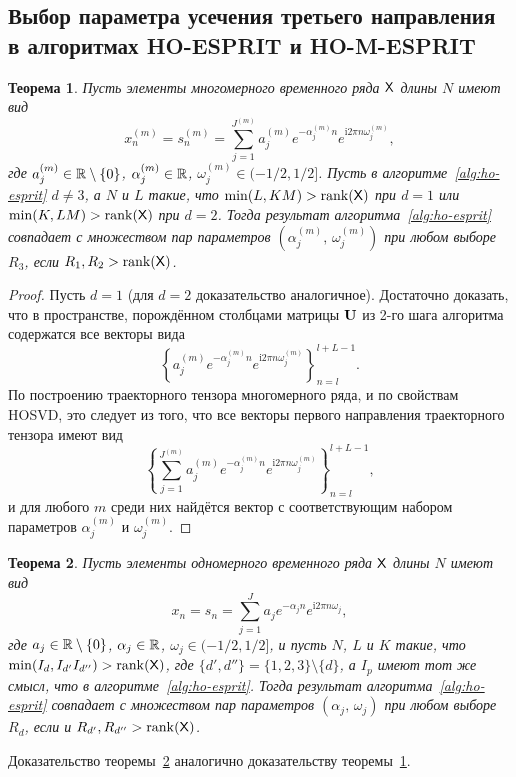 \documentclass[specialist,
  substylefile=spbu_report.rtx,
subf,href,colorlinks=true, 12pt]{disser}
\theoremstyle{plain}
\newtheorem{theorem}{Теорема}
\theoremstyle{definition}
\theoremstyle{remark}
\newcommand{\iu}{\mathrm{i}}
\begin{document}
\subsection{Выбор параметра усечения третьего направления в алгоритмах
HO-ESPRIT и HO-M-ESPRIT}\label{subsec:ho-esprit-r3}
\begin{theorem}\label{theorem:ho-m-esprit-r3}
  Пусть элементы многомерного временного ряда $\mathsf{X}$ длины $N$ имеют вид
  \begin{equation*}
    x_n^{(m)} = s_n^{(m)} = \sum_{j=1}^{J^{(m)}}
    a_j^{(m)} e^{-\alpha_j^{(m)} n} e^{\iu
    2 \pi n \omega_j^{(m)}},
  \end{equation*}
  где $a_j^{(m)} \in \mathbb{R} \setminus \{0\}$, $\alpha_j^{(m)} \in \mathbb{R}$,
  $\omega_j^{(m)} \in (-1/2, 1/2]$.
  Пусть в алгоритме~\ref{alg:ho-esprit} $d \ne 3$, а $N$ и $L$ такие,
  что $\min(L, KM) > \operatorname{rank}(\mathsf{X})$
  при $d=1$ или $\min(K, LM) > \operatorname{rank}(\mathsf{X})$ при $d=2$.
  Тогда результат алгоритма~\ref{alg:ho-esprit} совпадает с множеством
  пар параметров $(\alpha_j^{(m)},\, \omega_j^{(m)})$ при любом выборе $R_3$,
  если $R_1, R_2 >
  \operatorname{rank}(\mathsf{X})$.
\end{theorem}
\begin{proof}
  Пусть $d = 1$ (для $d=2$ доказательство аналогичное). Достаточно
  доказать, что в пространстве, порождённом столбцами
  матрицы $\mathbf{U}$ из 2-го шага алгоритма содержатся все векторы вида
  \[
    \left\{a_j^{(m)} e^{-\alpha_j^{(m)} n} e^{\iu
    2 \pi n \omega_j^{(m)}}\right\}_{n=l}^{l+L-1}.
  \]
  По построению траекторного тензора многомерного ряда, и по
  свойствам HOSVD, это
  следует из того, что все векторы первого направления траекторного
  тензора имеют вид
  \[
    \left\{\sum_{j=1}^{J^{(m)}} a_j^{(m)} e^{-\alpha_j^{(m)} n} e^{\iu
    2 \pi n \omega_j^{(m)}}\right\}_{n=l}^{l + L - 1},
  \]
  и для любого $m$ среди них найдётся вектор с соответствующим
  набором параметров $\alpha_j^{(m)}$ и $\omega_j^{(m)}$.
\end{proof}

\begin{theorem}\label{theorem:ho-esprit-r3}
  Пусть элементы одномерного временного ряда $\mathsf{X}$ длины $N$ имеют вид
  \begin{equation*}
    x_n = s_n = \sum_{j=1}^{J} a_j e^{-\alpha_j n} e^{\iu
    2 \pi n \omega_j},
  \end{equation*}
  где $a_j \in \mathbb{R} \setminus \{0\}$, $\alpha_j \in \mathbb{R}$, $\omega_j
  \in (-1/2, 1/2]$,
  и пусть $N$, $L$ и $K$ такие, что $\min(I_d, I_{d'}
  I_{d''}) >
  \operatorname{rank}(\mathsf{X})$, где $\{d', d''\} = \{1, 2, 3\}\setminus\{d\}$,
  а $I_p$ имеют тот же смысл, что в алгоритме~\ref{alg:ho-esprit}.
  Тогда результат алгоритма~\ref{alg:ho-esprit} совпадает с множеством
  пар параметров $(\alpha_j,\,\omega_j)$ при любом выборе $R_d$, если
  и $R_{d'}, R_{d''} >
  \operatorname{rank}(\mathsf{X})$.
\end{theorem}
Доказательство теоремы~\ref{theorem:ho-esprit-r3} аналогично
доказательству теоремы~\ref{theorem:ho-m-esprit-r3}.
\end{document}
